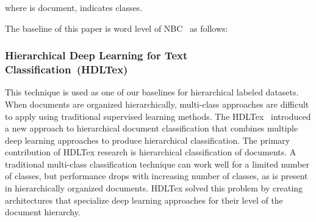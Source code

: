 \documentclass[sigconf, final]{acmart}
\begin{document}
where  is document,  indicates classes.

The baseline of this paper is word level of NBC~\cite{kim2006some} as follows:


\subsubsection{Hierarchical Deep Learning for Text Classification~(HDLTex)} This technique is used as one of our baselines for hierarchical labeled datasets. When documents are organized hierarchically, multi-class approaches are difficult to apply using traditional supervised learning methods. The HDLTex~\cite{kowsari2017HDLTex} introduced a new approach to hierarchical document classification that combines multiple deep learning approaches to produce hierarchical classification. The primary contribution of HDLTex research is hierarchical classification of documents.  A traditional multi-class classification technique can work well for a limited number of classes, but performance drops with increasing number of classes, as is present in hierarchically organized documents. HDLTex solved this problem by creating architectures that specialize deep learning approaches for their level of the document hierarchy.


\vspace{-0.1in}
\end{document}
